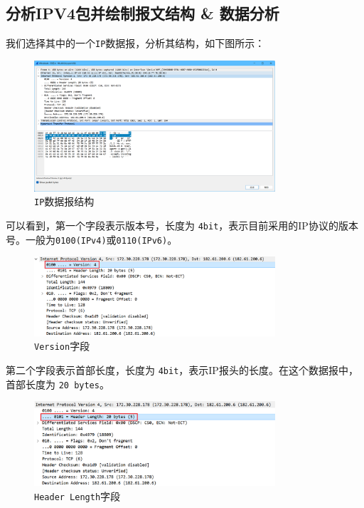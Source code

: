 \documentclass{article}
\begin{document}
\subsection{分析IPV4包并绘制报文结构 \& 数据分析}

我们选择其中的一个\texttt{IP}数据报，分析其结构，如下图所示：

\begin{figure}[H]
  \centering
  \includegraphics[width=0.8\textwidth]{img/4.png}
  \caption{\texttt{IP}数据报结构}
  \label{fig:4}
\end{figure}

可以看到，第一个字段表示版本号，长度为 \texttt{4bit}，表示目前采用的IP协议的版本号。一般为\texttt{0100(IPv4)}或\texttt{0110(IPv6)}。

\begin{figure}[H]
  \centering
  \includegraphics[width=0.8\textwidth]{img/4_1.png}
  \caption{\texttt{Version}字段}
  \label{fig:5}
\end{figure}

第二个字段表示首部长度，长度为 \texttt{4bit}，表示IP报头的长度。在这个数据报中，首部长度为 \texttt{20 bytes}。

\begin{figure}[H]
  \centering
  \includegraphics[width=0.8\textwidth]{img/5.png}
  \caption{\texttt{Header Length}字段}
  \label{fig:6}
\end{figure}
\end{document}
